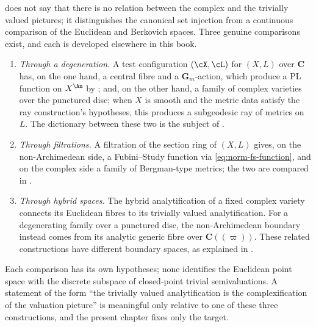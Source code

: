 \begin{remark}
\label{rem:ch32-complexification-content}
 does not say that there is no
relation between the complex and the trivially valued pictures; it distinguishes the canonical set injection from a continuous
comparison of the Euclidean and Berkovich spaces.  Three genuine
comparisons exist, and each is developed elsewhere in this book.
\begin{enumerate}
\item\emph{Through a degeneration.}  A test configuration $(\cX,\cL)$ for
$(X,L)$ over $\mathbf C$ has, on the one hand, a central fibre and a
$\mathbf G_m$-action, which produce a PL function on $X^{\An}$ by
; and, on the other hand, a family of
complex varieties over the punctured disc; when $X$ is smooth and
the metric data satisfy the ray construction's hypotheses, this produces
a subgeodesic ray of metrics on $L$.  The dictionary between these two is the subject of
.
\item\emph{Through filtrations.}  A filtration of the section ring of
$(X,L)$ gives, on the non-Archimedean side, a Fubini--Study function via
\eqref{eq:norm-fs-function}, and on the complex side a family of
Bergman-type metrics; the two are compared in
.
\item\emph{Through hybrid spaces.}  The hybrid analytification of a fixed complex variety connects its
Euclidean fibres to its trivially valued analytification.  For a
degenerating family over a punctured disc, the non-Archimedean boundary
instead comes from its analytic generic fibre over $\mathbf C((\varpi))$.
These related constructions have different boundary spaces, as explained
in
.
\end{enumerate}
Each comparison has its own hypotheses; none identifies the
Euclidean point space with the discrete subspace of closed-point trivial
semivaluations.  A statement of the form ``the trivially valued
analytification is the complexification of the valuation picture'' is
meaningful only relative to one of these three constructions, and the
present chapter fixes only the target.
\end{remark}

